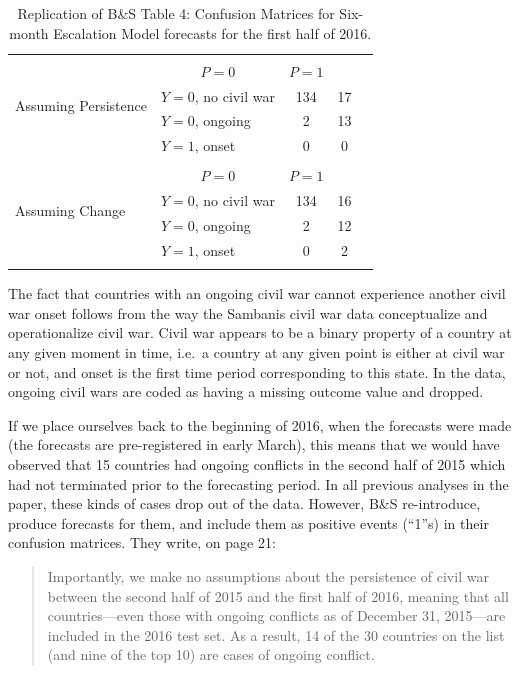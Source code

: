 \documentclass[
]{article}
\begin{document}
\begin{table}
\caption{Replication of B\&S Table 4: Confusion Matrices for Six-month Escalation Model forecasts for the first half of 2016.}\label{tab:table4}
\centering
\begin{tabular}{ll|c|c|l}
\multicolumn{1}{l}{\multirow{5}{*}{Assuming Persistence}} & \multicolumn{3}{c}{} \\
\multicolumn{2}{c}{}& \multicolumn{1}{c}{$P=0$} & \multicolumn{1}{c}{$P=1$} \\
\cline{3-4}
& $Y=0$, no civil war & 134 & 17 \\
\cline{3-4}
& $Y=0$, ongoing & 2 & 13 \\
\cline{3-4}
& $Y=1$, onset & 0 & 0 \\
\cline{3-4}
\multicolumn{1}{l}{\multirow{5}{*}{Assuming Change}} & \multicolumn{3}{c}{} \\
\multicolumn{2}{c}{}& \multicolumn{1}{c}{$P=0$} & \multicolumn{1}{c}{$P=1$} \\
\cline{3-4}
& $Y=0$, no civil war & 134 & 16 \\
\cline{3-4}
& $Y=0$, ongoing & 2 & 12 \\
\cline{3-4}
& $Y=1$, onset & 0 & 2 \\
\cline{3-4}
\\
\end{tabular}
\end{table}

The fact that countries with an ongoing civil war cannot experience another civil war onset follows from the way the Sambanis civil war data conceptualize and operationalize civil war. Civil war appears to be a binary property of a country at any given moment in time, i.e.~a country at any given point is either at civil war or not, and onset is the first time period corresponding to this state. In the data, ongoing civil wars are coded as having a missing outcome value and dropped.

If we place ourselves back to the beginning of 2016, when the forecasts were made (the forecasts are pre-registered in early March), this means that we would have observed that 15 countries had ongoing conflicts in the second half of 2015 which had not terminated prior to the forecasting period. In all previous analyses in the paper, these kinds of cases drop out of the data. However, B\&S re-introduce, produce forecasts for them, and include them as positive events (``1''s) in their confusion matrices. They write, on page 21:

\begin{quote}
Importantly, we make no assumptions about the persistence of civil war between the second half of 2015 and the first half of 2016, meaning that all countries---even those with ongoing conflicts as of December 31, 2015---are included in the 2016 test set. As a result, 14 of the 30 countries on the list (and nine of the top 10) are cases of ongoing conflict.
\end{quote}
\end{document}
